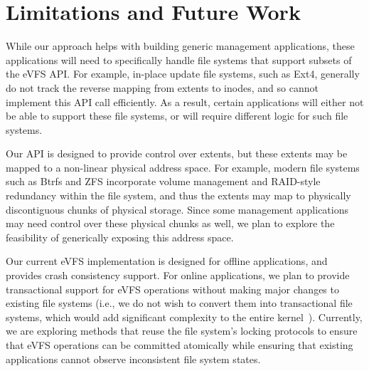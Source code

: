 \vspace{-0.7em}
\section{Limitations and Future Work\label{sec:Future_Work}}
\vspace{-0.4em}

While our approach helps with building generic management applications, these applications will need to specifically handle file systems that support subsets of the eVFS API. For example, in-place update file systems, such as Ext4, generally do not track the reverse mapping from extents to inodes, and so cannot implement this API call efficiently. As a result, certain applications will either not be able to support these file systems, or will require different logic for such file systems.


Our API is designed to provide control over extents, but these extents may be mapped to a non-linear physical address space. For example, modern file systems such as Btrfs and ZFS incorporate volume management and RAID-style redundancy within the file system, and thus the extents may map to physically discontiguous chunks of physical storage. Since some management applications may need control over these physical chunks as well, we plan to explore the feasibility of generically exposing this address space.


Our current eVFS implementation is designed for offline applications, and provides crash consistency support. For online applications, we plan to provide transactional support for eVFS operations without making major changes to existing file systems (i.e., we do not wish to convert them into transactional file systems, which would add significant complexity to the entire kernel~\cite{Spillane2009}). Currently, we are exploring methods that reuse the file system's locking protocols to ensure that eVFS operations can be committed atomically while ensuring that existing applications cannot observe inconsistent file system states.

